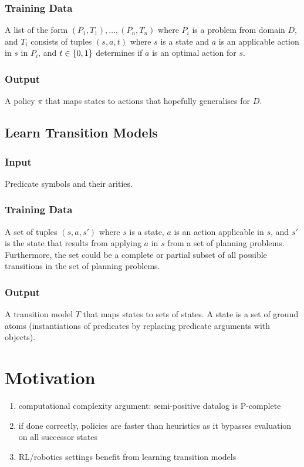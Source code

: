 \documentclass{article}
\begin{document}
\subsubsection*{Training Data} A list of the form $(P_1, T_1), \ldots, (P_n, T_n)$ where $P_i$ is a problem from domain $D$, and $T_i$ consists of tuples $(s, a, t)$ where $s$ is a state and $a$ is an applicable action in $s$ in $P_i$, and $t \in \left\{ 0, 1 \right\}$ determines if $a$ is an optimal action for $s$.

\subsubsection*{Output} A policy $\pi$ that maps states to actions that hopefully generalises for $D$.

\subsection{Learn Transition Models}
\subsubsection*{Input} Predicate symbols and their arities.

\subsubsection*{Training Data} A set of tuples $(s, a, s')$ where $s$ is a state, $a$ is an action applicable in $s$, and $s'$ is the state that results from applying $a$ in $s$ from a set of planning problems. Furthermore, the set could be a complete or partial subset of all possible transitions in the set of planning problems.

\subsubsection*{Output}
A transition model $T$ that maps states to sets of states. A state is a set of ground atoms (instantiations of predicates by replacing predicate arguments with objects).

\section{Motivation}
\begin{enumerate}
    \item computational complexity argument: semi-positive datalog is P-complete
    \item if done correctly, policies are faster than heuristics as it bypasses evaluation on all successor states
    \item RL/robotics settings benefit from learning transition models
\end{enumerate}
\end{document}
